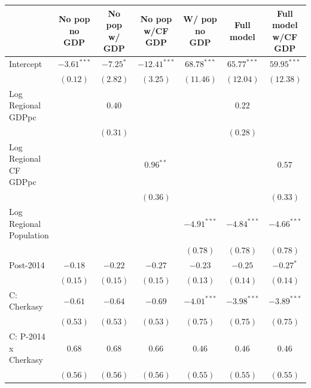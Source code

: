 
\begin{table}
\begin{center}
\begin{small}
\begin{tabular}{l c c c c c c}
\hline
 & No pop
no GDP & No pop
w/ GDP & No pop 
w/CF GDP & W/ pop
no GDP & Full model & Full model w/CF GDP \\
\hline
Intercept                   & $-3.61^{***}$ & $-7.25^{*}$  & $-12.41^{***}$ & $68.78^{***}$ & $65.77^{***}$ & $59.95^{***}$ \\
                            & $(0.12)$      & $(2.82)$     & $(3.25)$       & $(11.46)$     & $(12.04)$     & $(12.38)$     \\
Log Regional GDPpc          &               & $0.40$       &                &               & $0.22$        &               \\
                            &               & $(0.31)$     &                &               & $(0.28)$      &               \\
Log Regional CF GDPpc       &               &              & $0.96^{**}$    &               &               & $0.57$        \\
                            &               &              & $(0.36)$       &               &               & $(0.33)$      \\
Log Regional Population     &               &              &                & $-4.91^{***}$ & $-4.84^{***}$ & $-4.66^{***}$ \\
                            &               &              &                & $(0.78)$      & $(0.78)$      & $(0.78)$      \\
Post-2014                   & $-0.18$       & $-0.22$      & $-0.27$        & $-0.23$       & $-0.25$       & $-0.27^{*}$   \\
                            & $(0.15)$      & $(0.15)$     & $(0.15)$       & $(0.13)$      & $(0.14)$      & $(0.14)$      \\
C: Cherkasy                 & $-0.61$       & $-0.64$      & $-0.69$        & $-4.01^{***}$ & $-3.98^{***}$ & $-3.89^{***}$ \\
                            & $(0.53)$      & $(0.53)$     & $(0.53)$       & $(0.75)$      & $(0.75)$      & $(0.75)$      \\
C: P-2014 x Cherkasy        & $0.68$        & $0.68$       & $0.66$         & $0.46$        & $0.46$        & $0.46$        \\
                            & $(0.56)$      & $(0.56)$     & $(0.56)$       & $(0.55)$      & $(0.55)$      & $(0.55)$      \\

\end{tabular}
\end{small}
\end{center}
\end{table}
